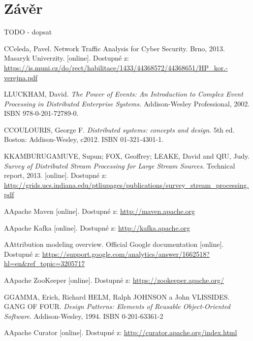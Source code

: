 \documentclass[
  digital, %
  table,   %
  nolof,     %
  nolot,     %
  oneside, %
  nocover,
  monochrome,
  12pt
]{fithesis3}
\begin{document}
\chapter{Závěr}
TODO - dopsat



\begin{thebibliography}{99}
\bibitem
CCeleda, Pavel. Network Traffic Analysis for Cyber Security. Brno, 2013. Masaryk Univerzity. [online]. Dostupné z: \url{https://is.muni.cz/do/rect/habilitace/1433/44368572/44368651/HP_kor.-verejna.pdf} \label{bib_celeda}

\bibitem
LLUCKHAM, David. \textit{The Power of Events: An Introduction to Complex
Event Processing in Distributed Enterprise Systems.} Addison-Wesley Professional, 2002. ISBN 978-0-201-72789-0. \label{bib_1}

\bibitem
CCOULOURIS, George F. \textit{Distributed systems: concepts and design}. 5th ed. Boston: Addison-Wesley, c2012. ISBN 01-321-4301-1. \label{bib_2}

\bibitem
KKAMBURUGAMUVE, Supun; FOX, Geoffrey; LEAKE, David and QIU, Judy. \textit{Survey of Distributed Stream Processing for Large Stream Sources}. Technical report, 2013. [online]. Dostupné z: \url{http://grids.ucs.indiana.edu/ptliupages/publications/survey_stream_processing.pdf} \label{bib_3}

\bibitem
AApache Maven [online]. Dostupné z: \url{http://maven.apache.org} \label{bib_4}

\bibitem
AApache Kafka [online]. Dostupné z: \url{http://kafka.apache.org} \label{bib_5}

\bibitem
AAttribution modeling overview. Official Google documentation [online]. Dostupné z: \url{https://support.google.com/analytics/answer/1662518?hl=en&ref_topic=3205717} \label{bib_6}

\bibitem
AApache ZooKeeper [online]. Dostupné z: \url{https://zookeeper.apache.org/} \label{bib_7}

\bibitem
GGAMMA, Erich, Richard HELM, Ralph JOHNSON a John VLISSIDES. GANG OF FOUR. \textit{Design Patterns: Elements of Reusable Object-Oriented Software}. Addison-Wesley, 1994. ISBN 0-201-63361-2 \label{bib_8}

\bibitem
AApache Curator [online]. Dostupné z: \url{http://curator.apache.org/index.html} \label{bib_9}


\end{thebibliography}
\end{document}
